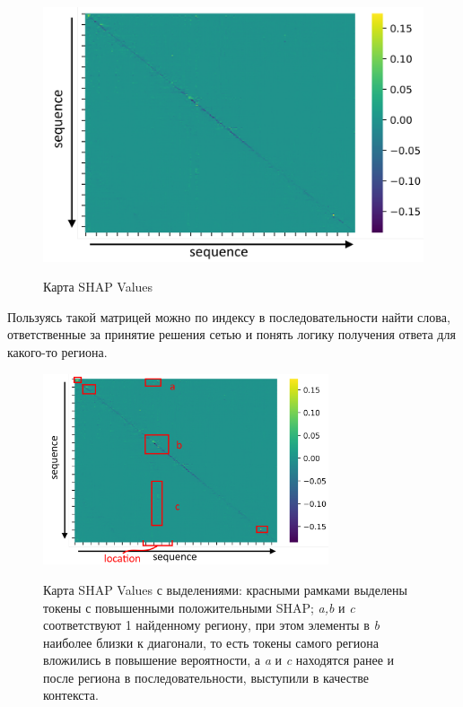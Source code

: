 \begin{figure}[h]
\caption{Карта SHAP Values}
\centering
\includegraphics[width=1\textwidth]{sequence_shap_map.png}
\label{shap_mt}
\end{figure}
Пользуясь такой матрицей можно по индексу в последовательности найти слова, ответственные за принятие решения сетью и понять логику получения ответа для какого-то региона.
\begin{figure}[h]
\caption{Карта SHAP Values с выделениями: красными рамками выделены токены с повышенными положительными SHAP; \textit{a,b} и \textit{c} соответствуют 1 найденному региону, при этом элементы в \textit{b} наиболее близки к диагонали, то есть токены самого региона вложились в повышение вероятности, а \textit{a} и \textit{c} находятся ранее и после региона в последовательности, выступили в качестве контекста.}
\centering
\includegraphics[width=0.75\textwidth]{sequence_shap_map_loc_annot.png}
\label{shap_mt_alloc}
\end{figure}